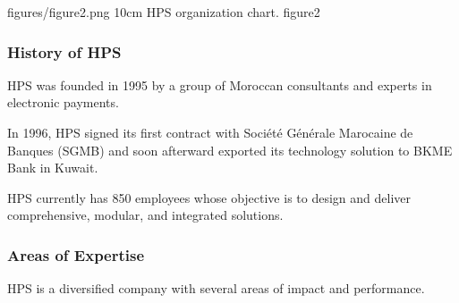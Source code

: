 \documentclass{classeENS}
\begin{document}
\insererfigure
{figures/figure2.png}
{10cm}
{HPS organization chart.}
{figure2}

\subsubsection{History of HPS}
HPS was founded in 1995 by a group of Moroccan consultants and experts in electronic payments. %

In 1996, HPS signed its first contract with Société Générale Marocaine de Banques (SGMB) and soon afterward exported its technology solution to BKME Bank in Kuwait. %

HPS currently has 850 employees whose objective is to design and deliver comprehensive, modular, and integrated solutions. %

\subsubsection{Areas of Expertise}
HPS is a diversified company with several areas of impact and performance. %
\end{document}
